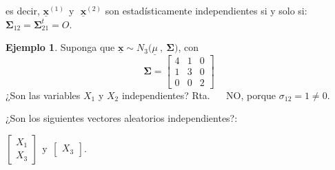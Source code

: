 \documentclass[
]{book}
\theoremstyle{definition}
\theoremstyle{definition}
\newtheorem{example}{Ejemplo}[chapter]
\theoremstyle{definition}
\theoremstyle{definition}
\theoremstyle{remark}
\begin{document}
es decir, \(\underline{\mathbf{x}}^{(1)}\ \ \text{y} \ \ \  \underline{\mathbf{x}}^{(2)}\) son estadísticamente independientes si y solo si:
\(\mathbf{\Sigma}_{12}=\mathbf{\Sigma}_{21}^t=O\).

\begin{example}
\protect\hypertarget{exm:ejemplo1-prop-5}{}\label{exm:ejemplo1-prop-5}Suponga que \(\underline{\mathbf{x}}\sim N_3 (\underline{\mu} \ , \ \mathbf{\Sigma)}\), con
\[
\mathbf{\Sigma}= \begin{bmatrix}
 4 & 1 & 0\\
 1 & 3 & 0 \\
 0 & 0 & 2
\end{bmatrix}
\]
¿Son las variables \(X_1\) y \(X_2\) independientes? Rta. ~~ NO, porque \(\sigma_{12}=1\neq 0\).

¿Son los siguientes vectores aleatorios independientes?:

\(\begin{bmatrix}X_1 \\ X_3 \end{bmatrix}\  \ \text{y} \ \ \begin{bmatrix} X_3 \end{bmatrix}\).


\end{example}
\end{document}
